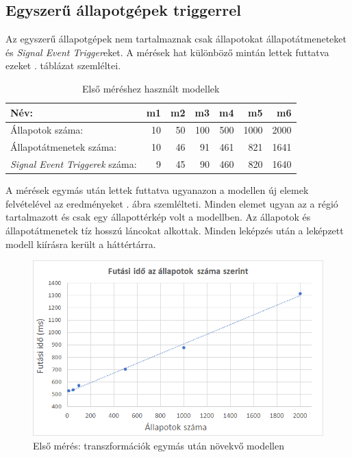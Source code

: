 \subsection{Egyszerű állapotgépek triggerrel}

Az egyszerű állapotgépek nem tartalmaznak csak állapotokat állapotátmeneteket és \emph{Signal Event Trigger}eket. A mérések hat különböző mintán lettek futtatva ezeket . táblázat szemléltei.

\begin{table}[H]
	\footnotesize
	\centering
	\begin{tabular}{ l r r r r r r}
		Név: & m1 & m2 & m3 & m4 & m5 & m6 \\ \hline
		Állapotok száma:  & 10 & 50 & 100 & 500 & 1000 & 2000 \\
		Állapotátmenetek száma: & 10 & 46 & 91 & 461 & 821 & 1641 \\
		\emph{Signal Event Triggerek} száma: & 9 & 45 & 90 & 460 & 820 & 1640
	\end{tabular}
	\caption{Első méréshez használt modellek}
	\label{table:meres1}
\end{table}

A mérések egymás után lettek futtatva ugyanazon a modellen új elemek felvételével az eredményeket . ábra szemlélteti. Minden elemet ugyan az a régió tartalmazott és csak egy állapottérkép volt a modellben. Az állapotok és állapotátmenetek tíz hosszú láncokat alkottak. Minden leképzés után a leképzett modell kiírásra került a háttértárra.

\begin{figure}[H]
	\centering
	\includegraphics[keepaspectratio, width=150mm]{figures/meres1.png}
	\caption{Első mérés: transzformációk egymás után növekvő modellen}
	\label{fig:meres1}
\end{figure}

